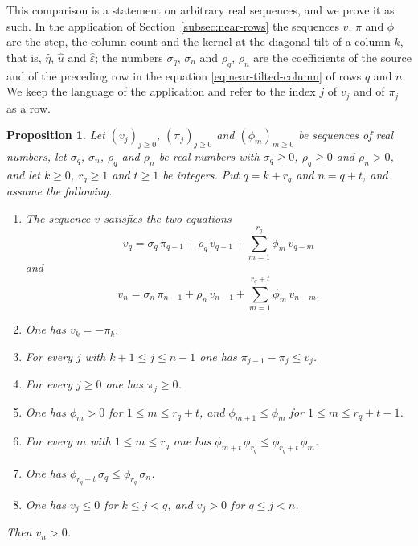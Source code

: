 \documentclass{amsart}
\newtheorem{proposition}[theorem]{Proposition}
\theoremstyle{definition}
\theoremstyle{remark}
\numberwithin{equation}{section}
\begin{document}
This comparison is a statement on arbitrary real sequences, and we prove it
as such. In the application of
Section~\ref{subsec:near-rows} the sequences $v$, $\pi$ and $\phi$ are the
step, the column count and the kernel at the diagonal tilt of a column $k$,
that is, $\hat\eta$, $\hat u$ and $\hat\varepsilon$; the numbers
$\sigma_q$, $\sigma_n$ and $\rho_q$, $\rho_n$ are the coefficients of the
source and of the preceding row in the equation
\eqref{eq:near-tilted-column} of rows $q$ and $n$. We keep the language of
the application and refer to the index $j$ of $v_j$ and of $\pi_j$ as a row.

\begin{proposition}\label{prop:tworows}
Let $(v_j)_{j\ge0}$, $(\pi_j)_{j\ge0}$ and $(\phi_m)_{m\ge0}$ be sequences of
real numbers, let $\sigma_q$, $\sigma_n$, $\rho_q$ and $\rho_n$ be real
numbers with $\sigma_q\ge0$, $\rho_q\ge0$ and $\rho_n>0$, and let $k\ge0$,
$r_q\ge1$ and $t\ge1$ be integers. Put $q=k+r_q$ and $n=q+t$, and assume the
following.
\begin{enumerate}
\item The sequence $v$ satisfies the two equations
\[
v_q=\sigma_q\,\pi_{q-1}+\rho_q\,v_{q-1}+\sum_{m=1}^{r_q}\phi_m\,v_{q-m}
\]
and
\[
v_n=\sigma_n\,\pi_{n-1}+\rho_n\,v_{n-1}+\sum_{m=1}^{r_q+t}\phi_m\,v_{n-m} .
\]
\item One has $v_k=-\pi_k$.
\item For every $j$ with $k+1\le j\le n-1$ one has $\pi_{j-1}-\pi_j\le v_j$.
\item For every $j\ge0$ one has $\pi_j\ge0$.
\item One has $\phi_m>0$ for $1\le m\le r_q+t$, and
$\phi_{m+1}\le\phi_m$ for $1\le m\le r_q+t-1$.
\item For every $m$ with $1\le m\le r_q$ one has
$\phi_{m+t}\,\phi_{r_q}\le\phi_{r_q+t}\,\phi_m$.
\item One has $\phi_{r_q+t}\,\sigma_q\le\phi_{r_q}\,\sigma_n$.
\item One has $v_j\le0$ for $k\le j<q$, and $v_j>0$ for $q\le j<n$.
\end{enumerate}
Then $v_n>0$.
\end{proposition}
\end{document}
